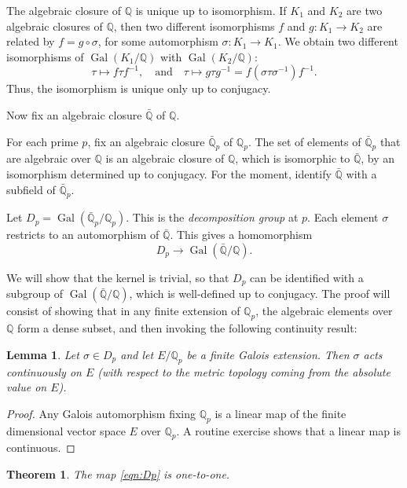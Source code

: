 \documentclass{amsart}
\def\op#1{{\operatorname{#1}}}
\newcommand{\ring}[1]{\mathbb{#1}}
\newtheorem{theorem}[equation]{Theorem}
\newtheorem{lemma}[equation]{Lemma}
\def\newterm#1{{\it #1}}
\begin{document}
The algebraic closure of $\ring{Q}$ is unique up to isomorphism.
If $K_1$ and $K_2$ are two algebraic closures of $\ring{Q}$, then two different
isomorphisms $f$ and $g:K_1\to K_2$ are related by $f = g \circ \sigma$, for some 
automorphism $\sigma: K_1\to K_1$.  We obtain two different isomorphisms
of $\op{Gal}(K_1/\ring{Q})$ with $\op{Gal}(K_2/\ring{Q})$:
\[
\tau \mapsto f \tau f^{-1},\quad \text{and}\quad \tau\mapsto g\tau g^{-1} = f (\sigma\tau\sigma^{-1}) f^{-1}.
\]
Thus, the isomorphism is unique only up to conjugacy.  

Now fix an algebraic closure $\bar{\ring{Q}}$ of $\ring{Q}$.

For each prime $p$, fix an algebraic closure $\bar{\ring{Q}}_p$ of
$\ring{Q}_p$.  The set of elements of $\bar{\ring{Q}}_p$ that are
algebraic over $\ring{Q}$ is an algebraic closure of $\ring{Q}$, which
is isomorphic to $\bar{\ring{Q}}$, by an isomorphism determined up to
conjugacy.  For the moment, identify $\bar{\ring{Q}}$ with a subfield
of $\bar{\ring{Q}}_p$.

Let $D_p = \op{Gal}(\bar{\ring{Q}}_p/\ring{Q}_p)$.  This is the
\newterm{decomposition group} at $p$.  Each element $\sigma$ restricts
to an automorphism of $\bar{\ring{Q}}$.  This gives a homomorphism
\begin{equation}\label{eqn:Dp}
D_p\to \op{Gal}(\bar{\ring{Q}}/\ring{Q}).
\end{equation}

We will show that the kernel is trivial, so that $D_p$ can be
identified with a subgroup of $\op{Gal}(\bar{\ring{Q}}/\ring{Q})$,
which is well-defined up to conjugacy.  The proof will consist of
showing that in any finite extension of $\ring{Q}_p$, the algebraic
elements over $\ring{Q}$ form a dense subset, and then invoking the
following continuity result:

\begin{lemma} Let $\sigma\in D_p$ and let $E/\ring{Q}_p$ be a finite Galois extension. 
Then $\sigma$ acts continuously on $E$ (with respect to the metric topology coming
from the absolute value on $E$).
\end{lemma}

\begin{proof}  Any Galois automorphism fixing $\ring{Q}_p$ is a linear map of
the finite dimensional vector space $E$ over $\ring{Q}_p$.  A routine exercise
shows that a linear map is continuous.
\end{proof}

\begin{theorem} The map \eqref{eqn:Dp} is one-to-one.
\end{theorem}
\end{document}
